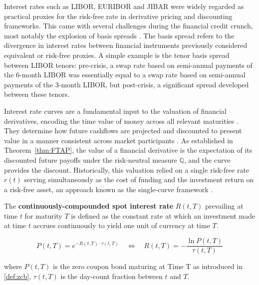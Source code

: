     \noindent
    Interest rates such as LIBOR, EURIBOR and JIBAR were widely regarded as practical proxies for the risk-free rate in derivative pricing and discounting frameworks. This came with several challenges during the financial credit crunch, most notably the explosion of basis spreads \cite{Green_2016}. The basis spread refers to the divergence in interest rates between financial instruments previously considered equivalent or risk-free proxies. A simple example is the tenor basis spread between LIBOR tenors: pre-crisis, a swap rate based on semi-annual payments of the 6-month LIBOR was essentially equal to a swap rate based on semi-annual payments of the 3-month LIBOR, but post-crisis, a significant spread developed between these tenors.
    

    \noindent
    Interest rate curves are a fundamental input to the valuation of financial derivatives, encoding the time value of money across all relevant maturities \cite{Hull_2018}. They determine how future cashflows are projected and discounted to present value in a manner consistent across market participants \cite{zhou2019practical}. As established in Theorem~\ref{thm:FTAP}, the value of a financial derivative is the expectation of its discounted future payoffs under the risk-neutral measure $\mathbb{Q}$, and the curve provides the discount. Historically, this valuation relied on a single risk-free rate $r(t)$ serving simultaneously as the cost of funding and the investment return on a risk-free asset, an approach known as the single-curve framework \cite{brigo2001interest}.
    
    \begin{definition} \label{def:spot_rate}
    The \textbf{continuously-compounded spot interest rate}  $R(t,T)$ prevailing at time  $t$  for maturity $T$ is defined as the constant rate at which an investment made at time  $t$  accrues continuously to yield one unit of currency at time $T$. 
    
        \begin{equation}
                P(t,T) = e^{-R(t,T) \cdot \tau(t,T)} \quad \Longleftrightarrow \quad R(t,T) = -\frac{\ln P(t,T)}{\tau(t,T)}
        \end{equation}
    
    \noindent    
    where $P(t,T)$ is the zero coupon bond maturing at Time T as introduced in \ref{def:zcb}, $\tau(t,T)$ is the day-count fraction between $t$ and $T$.
    \end{definition}

